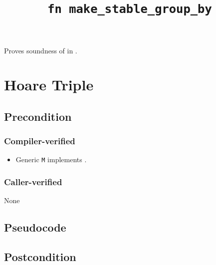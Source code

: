 \documentclass{article}
\title{\texttt{fn make\_stable\_group\_by}}
\author{\MichaelShoemateAuthor}
\begin{document}
\maketitle


\contrib

Proves soundness of 
in .

\section{Hoare Triple}
\subsection*{Precondition}
\subsubsection*{Compiler-verified}
\begin{itemize}
    \item Generic \texttt{M} implements .
\end{itemize}

\subsubsection*{Caller-verified}
None

\subsection*{Pseudocode}
\label{sec:python-pseudocode}


\subsection*{Postcondition}
\begin{theorem}
\end{theorem}
\end{document}
